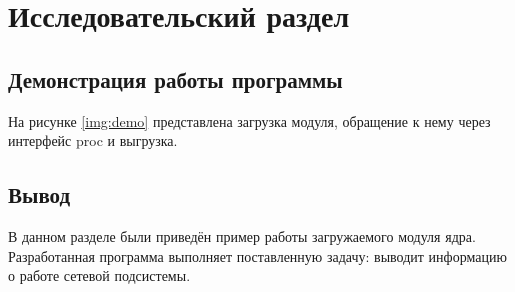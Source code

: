 \chapter{Исследовательский раздел}

\section{Демонстрация работы программы}

На рисунке \ref{img:demo} представлена загрузка модуля, обращение к нему через интерфейс proc и выгрузка.

\FloatBarrier

\section{Вывод}

В данном разделе были приведён пример работы загружаемого модуля ядра. Разработанная программа выполняет поставленную задачу: выводит информацию о работе сетевой подсистемы.